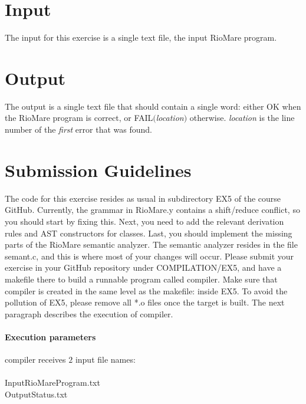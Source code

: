 \documentclass{article}
\begin{document}
\section{Input}
The input for this exercise is a single text file, the input RioMare program.

\section{Output}
The output is a single text file that should contain a single word:
either OK when the RioMare program is correct, or FAIL$($\textit{location}$)$ otherwise.
\textit{location} is the line number of the \textit{first} error that was found.

\section{Submission Guidelines}
The code for this exercise resides as usual in subdirectory EX5 of the course GitHub.
Currently, the grammar in RioMare.y contains a shift/reduce conflict,
so you should start by fixing this.
Next, you need to add the relevant derivation rules and AST constructors
for classes. Last, you should implement the missing parts of the RioMare semantic analyzer.
The semantic analyzer resides in the file semant.c, and this is where
most of your changes will occur.
Please submit your exercise in your GitHub repository under COMPILATION/EX5,
and have a makefile there to build a runnable program called compiler.
Make sure that compiler is created in the same level as the makefile: inside EX5.
To avoid the pollution of EX5, please remove all *.o files once the target is built.
The next paragraph describes the execution of compiler.

\paragraph{Execution parameters}
compiler receives $2$ input file names:\\ \\
InputRioMareProgram.txt\\
OutputStatus.txt
\end{document}
